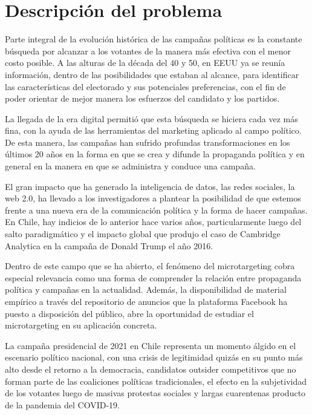 \documentclass[
  10pt,
  letterpaper,
]{report}
\begin{document}
\hypertarget{descripciuxf3n-del-problema}{%
\section{Descripción del problema}\label{descripciuxf3n-del-problema}}

Parte integral de la evolución histórica de las campañas políticas es la
constante búsqueda por alcanzar a los votantes de la manera más efectiva
con el menor costo posible. A las alturas de la década del 40 y 50, en
EEUU ya se reunía información, dentro de las posibilidades que estaban
al alcance, para identificar las características del electorado y sus
potenciales preferencias, con el fin de poder orientar de mejor manera
los esfuerzos del candidato y los partidos.

La llegada de la era digital permitió que esta búsqueda se hiciera cada
vez más fina, con la ayuda de las herramientas del marketing aplicado al
campo político. De esta manera, las campañas han sufrido profundas
transformaciones en los últimos 20 años en la forma en que se crea y
difunde la propaganda política y en general en la manera en que se
administra y conduce una campaña.

El gran impacto que ha generado la inteligencia de datos, las redes
sociales, la web 2.0, ha llevado a los investigadores a plantear la
posibilidad de que estemos frente a una nueva era de la comunicación
política y la forma de hacer campañas. En Chile, hay indicios de lo
anterior hace varios años, particularmente luego del salto paradigmático
y el impacto global que produjo el caso de Cambridge Analytica en la
campaña de Donald Trump el año 2016.

Dentro de este campo que se ha abierto, el fenómeno del microtargeting
cobra especial relevancia como una forma de comprender la relación entre
propaganda política y campañas en la actualidad. Además, la
disponibilidad de material empírico a través del repositorio de anuncios
que la plataforma Facebook ha puesto a disposición del público, abre la
oportunidad de estudiar el microtargeting en su aplicación concreta.

La campaña presidencial de 2021 en Chile representa un momento álgido en
el escenario político nacional, con una crisis de legitimidad quizás en
su punto más alto desde el retorno a la democracia, candidatos outsider
competitivos que no forman parte de las coaliciones políticas
tradicionales, el efecto en la subjetividad de los votantes luego de
masivas protestas sociales y largas cuarentenas producto de la pandemia
del COVID-19.
\end{document}
